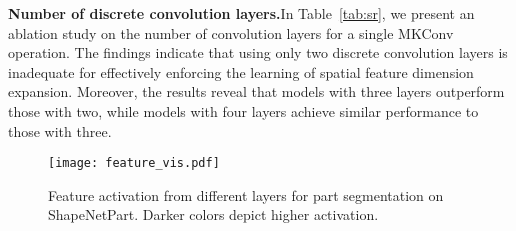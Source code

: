 \documentclass[preprint,12pt]{elsarticle}
\begin{document}
\bigskip
\noindent\textbf{Number of discrete convolution layers.}\hspace{0.3cm}In Table~\ref{tab:sr}, we present an ablation study on the number of convolution layers for a single MKConv operation. The findings indicate that using only two discrete convolution layers is inadequate for effectively enforcing the learning of spatial feature dimension expansion. Moreover, the results reveal that models with three layers outperform those with two, while models with four layers achieve similar performance to those with three.
\begin{table}[H]
\caption{Ablation study on the number of convolution layers for a single MKConv operation. }
\begin{center}
	\vspace{0cm}
	\label{tab:sr}
\end{center}
\end{table}

\begin{figure}[t]
\begin{center}
\texttt{[image: feature\_vis.pdf]}
\end{center}
\vspace{-0.1cm}
\caption{Feature activation from different layers for part segmentation on ShapeNetPart. Darker colors depict higher activation.
}
\label{fig:feature}
\end{figure}
\end{document}
